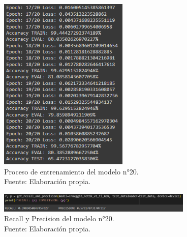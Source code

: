 \begin{figure}[H]
	\begin{center}
		\includegraphics[width=0.55\textwidth]{4/figures/model20_train.PNG}
		\caption[Proceso de entrenamiento del modelo n°20]{Proceso de entrenamiento del modelo n°20. \\
		Fuente: Elaboración propia.}
		\label{4:fig158}
	\end{center}
\end{figure}

\begin{figure}[H]
	\begin{center}
		\includegraphics[width=0.83\textwidth]{4/figures/model20_rp.PNG}
		\caption[Recall y Precision del modelo n°20]{Recall y Precision del modelo n°20. \\
		Fuente: Elaboración propia.}
		\label{4:fig159}
	\end{center}
\end{figure}

